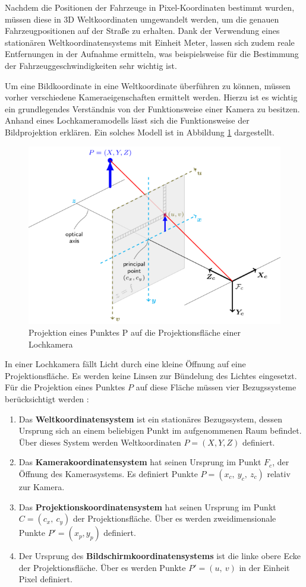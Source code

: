 Nachdem die Positionen der Fahrzeuge in Pixel-Koordinaten bestimmt wurden, müssen diese in 3D Weltkoordinaten
umgewandelt werden, um die genauen Fahrzeugpositionen auf der Straße zu erhalten. Dank der Verwendung eines
stationären Weltkoordinatensystems mit Einheit Meter, lassen sich zudem reale Entfernungen
in der Aufnahme ermitteln, was beispielsweise für die Bestimmung der Fahrzeuggeschwindigkeiten sehr wichtig ist.

Um eine Bildkoordinate in eine Weltkoordinate überführen zu können, müssen vorher verschiedene Kameraeigenschaften
ermittelt werden. Hierzu ist es wichtig ein grundlegendes Verständnis von der Funktionsweise einer Kamera zu besitzen.
Anhand eines Lochkameramodells lässt sich die Funktionsweise der Bildprojektion erklären.
Ein solches Modell ist in Abbildung \ref{fig:grund_pinhole_model} dargestellt.

\begin{figure}[H]
    \centering
    \includegraphics[width=0.55\linewidth]{resources/img/grundlagen/TrajectoryReconstruction/pinhole_camera_model}
    \caption[Bildprojektion im Lochkameramodell]
            {Projektion eines Punktes P auf die Projektionsfläche einer Lochkamera \cite[]{DevTeamOpenCV2018}}
    \label{fig:grund_pinhole_model}
\end{figure}

In einer Lochkamera fällt Licht durch eine kleine Öffnung auf eine Projektionsfläche. Es werden keine Linsen
zur Bündelung des Lichtes eingesetzt. Für die Projektion eines Punktes $P$ auf diese Fläche müssen vier
Bezugssysteme berücksichtigt werden \cite[]{Jahne2012}:

\begin{enumerate}
    \item Das \textbf{Weltkoordinatensystem} ist ein stationäres Bezugssystem, dessen Ursprung sich an einem beliebigen Punkt
            im aufgenommenen Raum befindet. Über dieses System werden Weltkoordinaten $P = (X, Y, Z)$ definiert.
    \item Das \textbf{Kamerakoordinatensystem} hat seinen Ursprung im Punkt $F_c$, der Öffnung des Kamerasystems.
            Es definiert Punkte $P = (x_c,\ y_c,\ z_c)$ relativ zur Kamera.
    \item Das \textbf{Projektionskoordinatensystem} hat seinen Ursprung im Punkt $C = (c_x,\ c_y)$ der Projektionsfläche.
            Über es werden zweidimensionale Punkte $P' = (x_p, y_p)$ definiert.
    \item Der Ursprung des \textbf{Bildschirmkoordinatensystems} ist die linke obere Ecke der Projektionsfläche.
            Über es werden Punkte $P' = (u,\ v)$ in der Einheit Pixel definiert.
\end{enumerate}

